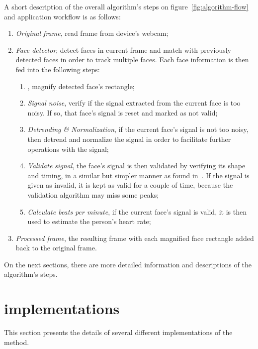 A short description of the overall algorithm's steps on
figure~\ref{fig:algorithm-flow} and application workflow is as follows:

\begin{enumerate}
  \item \emph{Original frame}, read frame from device's webcam;
  \item \emph{Face detector}, detect faces in current frame and match with
        previously detected faces in order to track multiple faces.
        Each face information is then fed into the following steps:
  \begin{enumerate}
    \item \emph{\evm}, magnify detected face's rectangle;
    \item \emph{Signal noise}, verify if the signal extracted from the
          current face is too noisy. If so, that face's signal is reset
          and marked as not valid;
    \item \emph{Detrending \& Normalization}, if the current face's signal is
          not too noisy, then detrend and normalize the signal in order to
          facilitate further operations with the signal;
    \item \emph{Validate signal}, the face's signal is then validated by
          verifying its shape and timing, in a similar but simpler manner as
          found in~\cite{Nenova2010Automated}. If the signal is given as
          invalid, it is kept as valid for a couple of time, because the
          validation algorithm may miss some peaks;
    \item \emph{Calculate beats per minute}, if the current face's signal is
          valid, it is then used to estimate the person's heart rate;
  \end{enumerate}
  \item \emph{Processed frame}, the resulting frame with each magnified face
        rectangle added back to the original frame.
\end{enumerate}

On the next sections, there are more detailed information and descriptions
of the algorithm's steps.

\section{\evm{} implementations} \label{sec:impl:evm}


This section presents the details of several different implementations of the
\evm{} method.

